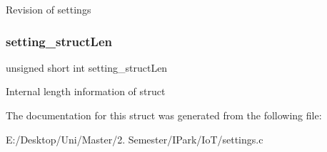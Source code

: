 Revision of settings \mbox{\label{struct_m_s___s_e_t_t_i_n_g_s___s_u_p_p_l__t_a41c4ce6120b5d5cad4345ea11c7fb9f8}} 
\subsubsection{\texorpdfstring{setting\+\_\+struct\+Len}{setting\_structLen}}
{\footnotesize\ttfamily unsigned short int setting\+\_\+struct\+Len}

Internal length information of struct 

The documentation for this struct was generated from the following file\+:\begin{DoxyCompactItemize}
\item 
E\+:/\+Desktop/\+Uni/\+Master/2. Semester/\+I\+Park/\+Io\+T/settings.\+c\end{DoxyCompactItemize}
